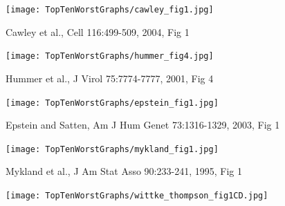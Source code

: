 \documentclass[12pt]{article}
\newcommand{\headsize}{\fontsize{35}{35} \selectfont}
\newcommand{\smallestsize}{\fontsize{18}{22} \selectfont}
\begin{document}
\vspace{30mm}

\centerline{\texttt{[image: TopTenWorstGraphs/cawley\_fig1.jpg]}}

\vfill \hfill \smallestsize \color{blue}
Cawley et al., Cell 116:499-509, 2004, Fig 1

\newpage
\thispagestyle{empty}


\headsize \color{yellow}
\hfill \begin{minipage}{5.75in}
\end{minipage}

\vspace{30mm}

\centerline{\texttt{[image: TopTenWorstGraphs/hummer\_fig4.jpg]}}

\vfill \hfill \smallestsize \color{blue}
Hummer et al., J Virol 75:7774-7777, 2001, Fig 4

\newpage
\thispagestyle{empty}


\headsize \color{yellow}
\hfill \begin{minipage}{5.75in}
\end{minipage}

\vspace{30mm}

\centerline{\texttt{[image: TopTenWorstGraphs/epstein\_fig1.jpg]}}


\vfill \hfill \smallestsize \color{blue}
Epstein and Satten, Am J Hum Genet 73:1316-1329, 2003, Fig 1

\newpage
\thispagestyle{empty}


\headsize \color{yellow}
\hfill \begin{minipage}{5.75in}
\end{minipage}

\vspace{30mm}


\centerline{\texttt{[image: TopTenWorstGraphs/mykland\_fig1.jpg]}}
\vfill \hfill \smallestsize \color{blue}
Mykland et al., J Am Stat Asso 90:233-241, 1995, Fig 1

\newpage
\thispagestyle{empty}


\headsize \color{yellow}
\hfill \begin{minipage}{5.75in}
\end{minipage}

\vspace{30mm}

\centerline{\texttt{[image: TopTenWorstGraphs/wittke\_thompson\_fig1CD.jpg]}}
\end{document}
